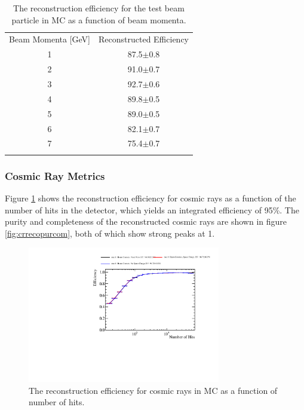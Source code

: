 \begin{table}
\centering
\caption{The reconstruction efficiency for the test beam particle in MC as a function of beam momenta.}
\label{tab:1} 
\begin{tabular}{cc}
\hline\noalign{\smallskip}
Beam Momenta [GeV] & Reconstructed Efficiency  \\
\noalign{\smallskip}\hline\noalign{\smallskip}
1 & 87.5$\pm$0.8 \\
2 & 91.0$\pm$0.7 \\
3 & 92.7$\pm$0.6 \\
4 & 89.8$\pm$0.5 \\
5 & 89.0$\pm$0.5 \\
6 & 82.1$\pm$0.7 \\
7 & 75.4$\pm$0.7 \\
\noalign{\smallskip}\hline
\end{tabular}
\end{table}

\subsubsection{Cosmic Ray Metrics}
\label{sec:crmetrics}
Figure \ref{fig:crrecoeff} shows the reconstruction efficiency for cosmic rays as a function of the number of hits in the detector, which yields an integrated efficiency of 95\%.  The purity and completeness of the reconstructed cosmic rays are shown in figure \ref{fig:crrecopurcom}, both of which show strong peaks at 1.

\begin{figure}
\includegraphics[width=0.75\textwidth]{Figures/Metrics/MC/Cosmics/CosmicRayEfficiencyVsNHits.pdf}
\caption{The reconstruction efficiency for cosmic rays in MC as a function of number of hits.}
\label{fig:crrecoeff}
\end{figure}

